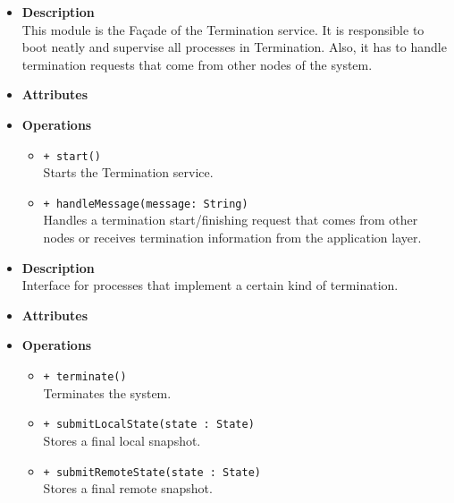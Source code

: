 \FloatBarrier
\begin{itemize}
  \item \textbf{Description} \\
    This module is the Fa\c cade of the Termination service. It is responsible
    to boot neatly and supervise all processes in Termination. Also, it has to
    handle termination requests that come from other nodes of the system.
  \item \textbf{Attributes}
  \item \textbf{Operations}
  \begin{itemize}
    \item \texttt{+ start()} \\
    Starts the Termination service.
    \item \texttt{+ handleMessage(message: String)} \\
    Handles a termination start/finishing request that comes from other nodes
    or receives termination information from the application layer.
  \end{itemize}
\end{itemize}

\FloatBarrier
\begin{itemize}
  \item \textbf{Description} \\
    Interface for processes that implement a certain kind of termination.
  \item \textbf{Attributes}
  \item \textbf{Operations}
  \begin{itemize}
    \item \texttt{+ terminate()} \\
    Terminates the system.
    \item \texttt{+ submitLocalState(state : State)} \\
    Stores a final local snapshot.
    \item \texttt{+ submitRemoteState(state : State)} \\
    Stores a final remote snapshot.
  \end{itemize}
\end{itemize}

